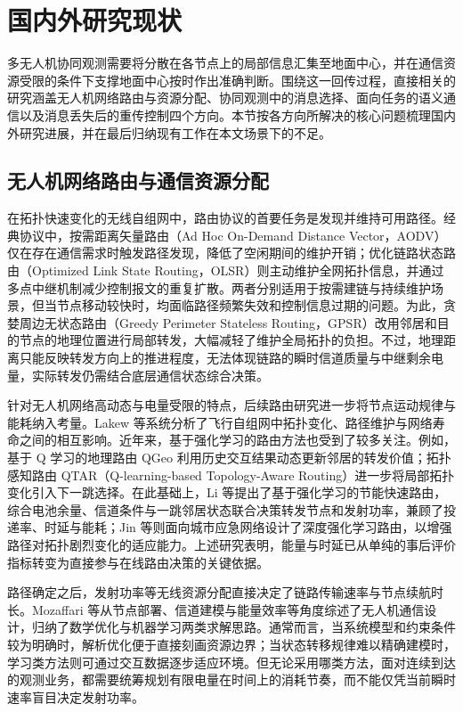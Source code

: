 \section{国内外研究现状}
\label{intro:related}

多无人机协同观测需要将分散在各节点上的局部信息汇集至地面中心，并在通信资源受限的条件下支撑地面中心按时作出准确判断。围绕这一回传过程，直接相关的研究涵盖无人机网络路由与资源分配、协同观测中的消息选择、面向任务的语义通信以及消息丢失后的重传控制四个方向。本节按各方向所解决的核心问题梳理国内外研究进展，并在最后归纳现有工作在本文场景下的不足。

\subsection{无人机网络路由与通信资源分配}

在拓扑快速变化的无线自组网中，路由协议的首要任务是发现并维持可用路径。经典协议中，按需距离矢量路由（Ad Hoc On-Demand Distance Vector，AODV）仅在存在通信需求时触发路径发现，降低了空闲期间的维护开销\cite{aodv}；优化链路状态路由（Optimized Link State Routing，OLSR）则主动维护全网拓扑信息，并通过多点中继机制减少控制报文的重复扩散\cite{olsr}。两者分别适用于按需建链与持续维护场景，但当节点移动较快时，均面临路径频繁失效和控制信息过期的问题。为此，贪婪周边无状态路由（Greedy Perimeter Stateless Routing，GPSR）改用邻居和目的节点的地理位置进行局部转发\cite{gpsr}，大幅减轻了维护全局拓扑的负担。不过，地理距离只能反映转发方向上的推进程度，无法体现链路的瞬时信道质量与中继剩余电量，实际转发仍需结合底层通信状态综合决策。

针对无人机网络高动态与电量受限的特点，后续路由研究进一步将节点运动规律与能耗纳入考量。Lakew 等系统分析了飞行自组网中拓扑变化、路径维护与网络寿命之间的相互影响\cite{intro4}。近年来，基于强化学习的路由方法也受到了较多关注。例如，基于 Q 学习的地理路由 QGeo 利用历史交互结果动态更新邻居的转发价值\cite{qgeo}；拓扑感知路由 QTAR（Q-learning-based Topology-Aware Routing）进一步将局部拓扑变化引入下一跳选择\cite{qtar}。在此基础上，Li 等提出了基于强化学习的节能快速路由，综合电池余量、信道条件与一跳邻居状态联合决策转发节点和发射功率，兼顾了投递率、时延与能耗\cite{drlfr}；Jin 等则面向城市应急网络设计了深度强化学习路由，以增强路径对拓扑剧烈变化的适应能力\cite{drlrr}。上述研究表明，能量与时延已从单纯的事后评价指标转变为直接参与在线路由决策的关键依据。

路径确定之后，发射功率等无线资源分配直接决定了链路传输速率与节点续航时长。Mozaffari 等从节点部署、信道建模与能量效率等角度综述了无人机通信设计，归纳了数学优化与机器学习两类求解思路\cite{mozaffari2019tutorial}。通常而言，当系统模型和约束条件较为明确时，解析优化便于直接刻画资源边界；当状态转移规律难以精确建模时，学习类方法则可通过交互数据逐步适应环境。但无论采用哪类方法，面对连续到达的观测业务，都需要统筹规划有限电量在时间上的消耗节奏，而不能仅凭当前瞬时速率盲目决定发射功率。

